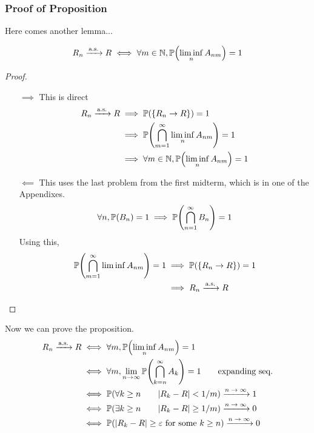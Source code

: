 \subsubsection{Proof of Proposition}
Here comes another lemma...
\begin{lemma}
    \begin{align}
        R_n \ce{->[\text{a.s.}]} R \iff \forall m \in \natural, \probability\qty(\liminf_n A_{nm}) = 1
    \end{align}
\end{lemma}
\begin{proof}
    \begin{enumerate}
        \item[$\implies$] This is direct
            \begin{align}
                R_n \ce{->[\text{a.s.}]} R
                &\implies \probability(\{ R_n \to R \}) = 1\\
                &\implies \probability\qty(\bigcap_{m=1}^\infty \liminf_n A_{nm}) = 1\\
                &\implies \forall m \in \natural, \probability\qty(\liminf_n A_{nm}) = 1
            \end{align}
        \item[$\impliedby$] This uses the last problem from the first midterm, which is in one of the Appendixes.
            \begin{align}
                \forall n, \mathbb{P}(B_n) = 1 \implies \mathbb{P}\qty(\bigcap_{n=1}^\infty B_n) = 1
            \end{align}
            Using this,
            \begin{align}
                \probability\qty(\bigcap_{m=1}^\infty \liminf A_{nm}) = 1
                &\implies \probability(\{ R_n \to R \}) = 1\\
                &\implies R_n \ce{->[\text{a.s.}]} R
            \end{align}
    \end{enumerate}
\end{proof}

Now we can prove the proposition.
\begin{align}
    R_n \ce{->[\text{a.s.}]} R &\iff \forall m, \probability\qty(\liminf_n A_{nm}) = 1\\
    &\iff \forall m, \lim_{n\to\infty} \probability\qty(\bigcap_{k=n}^\infty A_k) = 1 \qsp \text{expanding seq.}\\
    &\iff \probability\qty(\forall k \ge n \qsp \abs{R_k - R} < 1/m) \ce{->[$n \to \infty$]} 1\\
    &\iff \probability\qty(\exists k \ge n \qsp \abs{R_k - R} \ge 1/m) \ce{->[$n \to \infty$]} 0\\
    &\iff \probability\qty(\abs{R_k - R} \ge \varepsilon \text{ for some $k \ge n$}) \ce{->[$n \to \infty$]} 0
\end{align}

